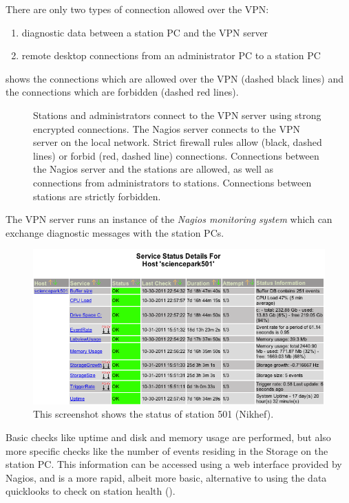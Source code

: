 There are only two types of connection allowed over the VPN:
\begin{enumerate}
    \item diagnostic data between a station PC and the VPN server
    \item remote desktop connections from an administrator PC to a station
    PC
\end{enumerate}
 shows the connections which are allowed over the
VPN (dashed black lines) and the connections which are forbidden (dashed red
lines).
\begin{figure}
\centering

\caption{  Stations
and administrators connect to the VPN server using strong encrypted
connections.  The Nagios server connects to the VPN server on the local
network.  Strict firewall rules allow (black, dashed lines) or forbid (red,
dashed line) connections.  Connections between the Nagios server and the
stations are allowed, as well as connections from administrators to stations.
Connections between stations are strictly forbidden.}
\label{fig:vpn-connections}
\end{figure}

The VPN server runs an instance of the \emph{Nagios monitoring
system} \cite{Nagios} which can exchange diagnostic messages with the station
PCs.
\begin{figure}
\centering
\includegraphics[width=\linewidth]{figures/screenshot-nagios}
\caption{  This
screenshot shows the status of station 501 (Nikhef).}
\label{fig:nagios}
\end{figure}
Basic checks like uptime and disk and memory usage are performed, but
also more specific checks like the number of events residing in the Storage on
the station PC.  This information can be accessed using a web interface provided
by Nagios, and is a more rapid, albeit more basic, alternative to using the
data quicklooks to check on station health ().

